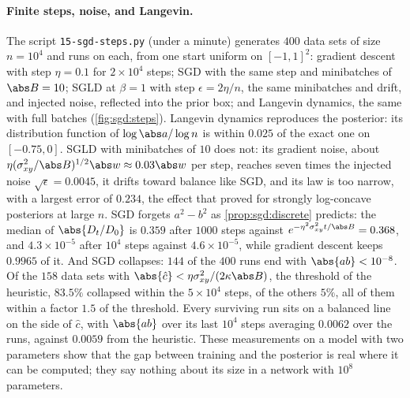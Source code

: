 \begin{refsection}
\begin{figure}[t]
\end{figure}

\paragraph{Finite steps, noise, and Langevin.} The script \texttt{15-sgd-steps.py} (under a minute) generates $400$ data sets of size $n=10^4$ and runs on each, from one start uniform on $[-1,1]^2$: gradient descent with step $\eta=0.1$ for $2\times10^4$ steps; SGD with the same step and minibatches of $\abs B=10$; SGLD at $\beta=1$ with step $\epsilon=2\eta/n$, the same minibatches and drift, and injected noise, reflected into the prior box; and Langevin dynamics, the same with full batches (\cref{fig:sgd:steps}). Langevin dynamics reproduces the posterior: its distribution function of $\log\abs a/\log n$ is within $0.025$ of the exact one on $[-0.75,0]$. SGLD with minibatches of $10$ does not: its gradient noise, about $\eta(\sgdvar/\abs B)^{1/2}\abs w\approx0.03\abs w$ per step, reaches seven times the injected noise $\sqrt\epsilon=0.0045$, it drifts toward balance like SGD, and its law is too narrow, with a largest error of $0.234$, the effect that \textcite{BrosseEtAl2018} proved for strongly log-concave posteriors at large $n$. SGD forgets $a^2-b^2$ as \cref{prop:sgd:discrete} predicts: the median of $\abs{D_t/D_0}$ is $0.359$ after $1000$ steps against $e^{-\eta^2\sgdvar t/\abs B}=0.368$, and $4.3\times10^{-5}$ after $10^4$ steps against $4.6\times10^{-5}$, while gradient descent keeps $0.9965$ of it. And SGD collapses: $144$ of the $400$ runs end with $\abs{ab}<10^{-8}$. Of the $158$ data sets with $\abs{\hat c}<\eta\sgdvar/(2\kappa\abs B)$, the threshold of the heuristic, $83.5\%$ collapsed within the $5\times10^4$ steps, of the others $5\%$, all of them within a factor $1.5$ of the threshold. Every surviving run sits on a balanced line on the side of $\hat c$, with $\abs{ab}$ over its last $10^4$ steps averaging $0.0062$ over the runs, against $0.0059$ from the heuristic. These measurements on a model with two parameters show that the gap between training and the posterior is real where it can be computed; they say nothing about its size in a network with $10^8$ parameters.


\end{refsection}
